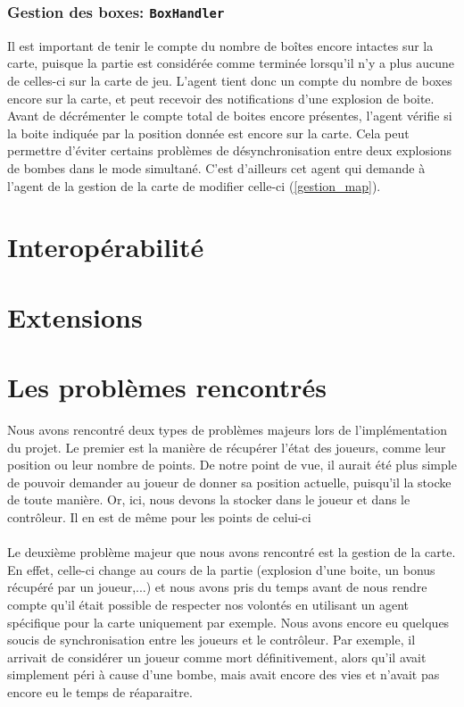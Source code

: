 \documentclass{article}
\begin{document}
\subsubsection{Gestion des boxes: \texttt{BoxHandler}}
\label{gestion_boxes}
Il est important de tenir le compte du nombre de boîtes encore intactes sur la carte, puisque la partie est considérée comme terminée lorsqu'il n'y a plus aucune de celles-ci sur la carte de jeu. L'agent tient donc un compte du nombre de boxes encore sur la carte, et peut recevoir des notifications d'une explosion de boite. Avant de décrémenter le compte total de boites encore présentes, l'agent vérifie si la boite indiquée par la position donnée est encore sur la carte. Cela peut permettre d'éviter certains problèmes de désynchronisation entre deux explosions de bombes dans le mode simultané. C'est d'ailleurs cet agent qui demande à l'agent de la gestion de la carte de modifier celle-ci (\ref{gestion_map}).

\section{Interopérabilité}
\section{Extensions}
\section{Les problèmes rencontrés}
Nous avons rencontré deux types de problèmes majeurs lors de l'implémentation du projet. Le premier est la manière de récupérer l'état des joueurs, comme leur position ou leur nombre de points. De notre point de vue, il aurait été plus simple de pouvoir demander au joueur de donner sa position actuelle, puisqu'il la stocke de toute manière. Or, ici, nous devons la stocker dans le joueur et dans le contrôleur. Il en est de même pour les points de celui-ci \\ \\
Le deuxième problème majeur que nous avons rencontré est la gestion de la carte. En effet, celle-ci change au cours de la partie (explosion d'une boite, un bonus récupéré par un joueur,...) et nous avons pris du temps avant de nous rendre compte qu'il était possible de respecter nos volontés en utilisant un agent spécifique pour la carte uniquement par exemple. Nous avons encore eu quelques soucis de synchronisation entre les joueurs et le contrôleur. Par exemple, il arrivait de considérer un joueur comme mort définitivement, alors qu'il avait simplement péri à cause d'une bombe, mais avait encore des vies et n'avait pas encore eu le temps de réaparaitre.
\end{document}
